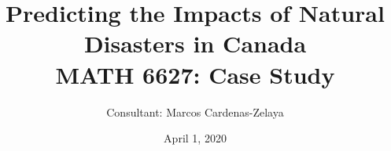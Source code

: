 \documentclass{beamer}
\title[]{Predicting the Impacts of Natural Disasters in Canada\\ 
{
\medskip
}
\small MATH 6627: Case Study}
\author{Consultant: Marcos Cardenas-Zelaya} %

{

\medskip

}
\date{April 1, 2020} %
\begin{document}
	
\begin{frame}
	\titlepage 
\end{frame}










\end{document}
